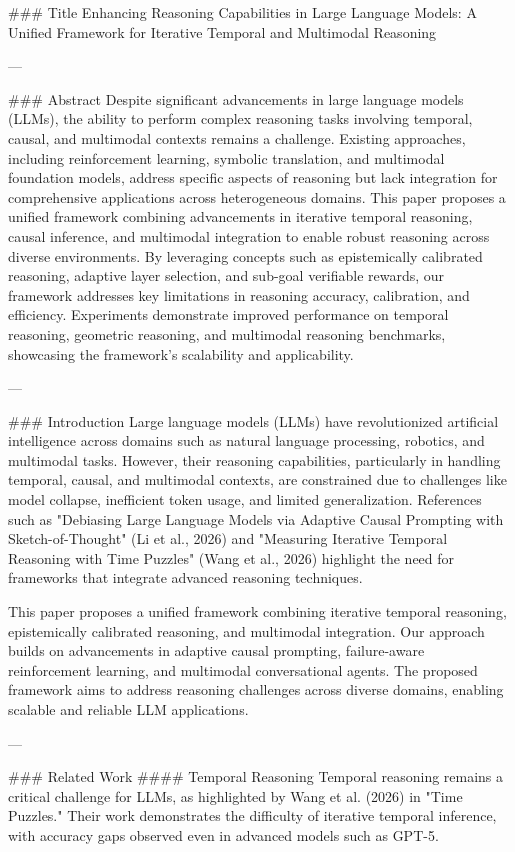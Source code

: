 ### Title  
Enhancing Reasoning Capabilities in Large Language Models: A Unified Framework for Iterative Temporal and Multimodal Reasoning  

---

### Abstract  
Despite significant advancements in large language models (LLMs), the ability to perform complex reasoning tasks involving temporal, causal, and multimodal contexts remains a challenge. Existing approaches, including reinforcement learning, symbolic translation, and multimodal foundation models, address specific aspects of reasoning but lack integration for comprehensive applications across heterogeneous domains. This paper proposes a unified framework combining advancements in iterative temporal reasoning, causal inference, and multimodal integration to enable robust reasoning across diverse environments. By leveraging concepts such as epistemically calibrated reasoning, adaptive layer selection, and sub-goal verifiable rewards, our framework addresses key limitations in reasoning accuracy, calibration, and efficiency. Experiments demonstrate improved performance on temporal reasoning, geometric reasoning, and multimodal reasoning benchmarks, showcasing the framework's scalability and applicability.  

---

### Introduction  
Large language models (LLMs) have revolutionized artificial intelligence across domains such as natural language processing, robotics, and multimodal tasks. However, their reasoning capabilities, particularly in handling temporal, causal, and multimodal contexts, are constrained due to challenges like model collapse, inefficient token usage, and limited generalization. References such as "Debiasing Large Language Models via Adaptive Causal Prompting with Sketch-of-Thought" (Li et al., 2026) and "Measuring Iterative Temporal Reasoning with Time Puzzles" (Wang et al., 2026) highlight the need for frameworks that integrate advanced reasoning techniques.

This paper proposes a unified framework combining iterative temporal reasoning, epistemically calibrated reasoning, and multimodal integration. Our approach builds on advancements in adaptive causal prompting, failure-aware reinforcement learning, and multimodal conversational agents. The proposed framework aims to address reasoning challenges across diverse domains, enabling scalable and reliable LLM applications.

---

### Related Work  
#### Temporal Reasoning  
Temporal reasoning remains a critical challenge for LLMs, as highlighted by Wang et al. (2026) in "Time Puzzles." Their work demonstrates the difficulty of iterative temporal inference, with accuracy gaps observed even in advanced models such as GPT-5.  

